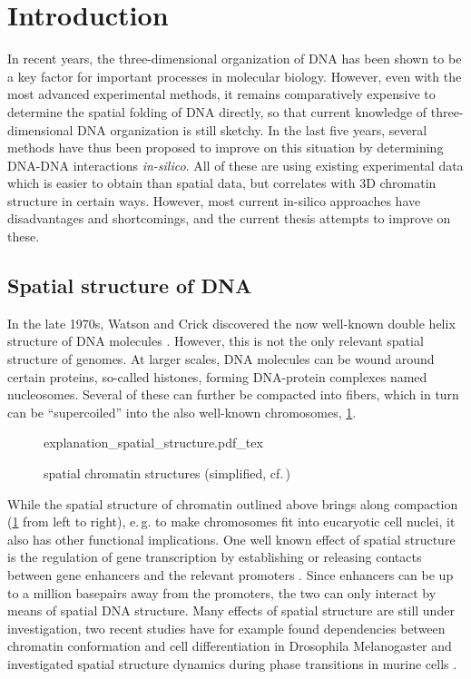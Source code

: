 \section{Introduction}
In recent years, the three-dimensional organization of DNA has been shown to 
be a key factor for important processes in molecular biology.
However, even with the most advanced experimental methods, 
it remains comparatively expensive to determine the spatial folding of DNA directly,
so that current knowledge of three-dimensional DNA organization is still sketchy.
In the last five years, several methods have thus been proposed to improve on this situation
by determining DNA-DNA interactions \emph{in-silico}.
All of these are using existing experimental data which is easier to obtain than spatial data, but correlates with 3D chromatin structure in certain ways.
However, most current in-silico approaches have disadvantages and shortcomings,
and the current thesis attempts to improve on these.

\subsection{Spatial structure of DNA}
In the late 1970s, Watson and Crick discovered the now well-known double helix structure of DNA molecules \cite{Watson1953}.
However, this is not the only relevant spatial structure of genomes. 
At larger scales, DNA molecules can be wound around certain proteins, so-called histones, forming DNA-protein complexes named nucleosomes.
Several of these can further be compacted into fibers, which in turn can be ``supercoiled'' into the also well-known chromosomes, \cref{fig:intro:spatial_chrom_structures}.
\begin{figure}[h!]
 \small
 \centering
 {explanation_spatial_structure.pdf_tex}
 \caption{spatial chromatin structures (simplified, cf.\,\cite{Lee2001})} \label{fig:intro:spatial_chrom_structures}
\end{figure}


While the spatial structure of chromatin outlined above brings along compaction (\cref{fig:intro:spatial_chrom_structures} from left to right), 
e.\,g. to make chromosomes fit into eucaryotic cell nuclei,
it also has other functional implications.
One well known effect of spatial structure is the regulation of gene transcription by establishing or releasing contacts
between gene enhancers and the relevant promoters \cite{Smallwood2013,Gorkin2014}.
Since enhancers can be up to a million basepairs away from the promoters, 
the two can only interact by means of spatial DNA structure.
Many effects of spatial structure are still under investigation, 
two recent studies have for example found dependencies between chromatin conformation 
and cell differentiation in Drosophila Melanogaster \cite{Chathoth2019}
and investigated spatial structure dynamics during phase transitions in murine cells \cite{Zhang2019b}.

